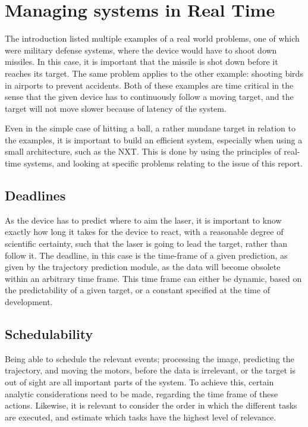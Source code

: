 
\section{Managing systems in Real Time} 
The introduction listed multiple examples of a real world problems, one of which were military defense systems, where the device would have to shoot down missiles.
In this case, it is important that the missile is shot down before it reaches its target.
The same problem applies to the other example: shooting birds in airports to prevent accidents.
Both of these examples are time critical in the sense that the given device has to continuously follow a moving target, and the target will not move slower because of latency of the system.

Even in the simple case of hitting a ball, a rather mundane target in relation to the examples, it is important to build an efficient system, especially when using a small architecture, such as the NXT.
This is done by using the principles of real-time systems, and looking at specific problems relating to the issue of this report.

\subsection{Deadlines}
As the device has to predict where to aim the laser, it is important to know exactly how long it takes for the device to react, with a reasonable degree of scientific certainty, such that the laser is going to lead the target, rather than follow it. 
The deadline, in this case is the time-frame of a given prediction, as given by the trajectory prediction module, as the data will become obsolete within an arbitrary time frame.
This time frame can either be dynamic, based on the predictability of a given target, or a constant specified at the time of development.

\subsection{Schedulability}
Being able to schedule the relevant events; processing the image, predicting the trajectory, and moving the motors, before the data is irrelevant, or the target is out of sight are all important parts of the system.
To achieve this, certain analytic considerations need to be made, regarding the time frame of these actions. 
Likewise, it is relevant to consider the order in which the different tasks are executed, and estimate which tasks have the highest level of relevance.


